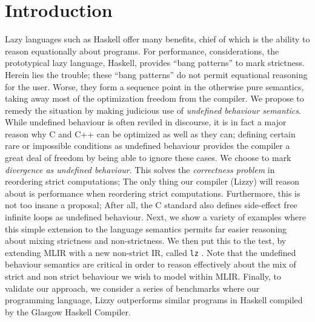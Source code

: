 \documentclass[sigplan,\review anonymous]{acmart}
\newcommand{\lz}{\texttt{lz} }
\begin{document}

\else
{} %
\renewcommand\footnotetextcopyrightpermission[1]{} %
\fi

\maketitle
\ifx\grammarly\grammarlyon 
\onecolumn 
\else 
\fi

\section{Introduction}

Lazy languages such as Haskell
offer many benefits, chief of which is the ability to reason
equationally about programs. For performance, considerations,
the prototypical lazy language, Haskell, provides ``bang patterns'' to
mark strictness. Herein lies the trouble; these ``bang patterns'' do not
permit equational reasoning for the user. Worse, they form a sequence point
in the otherwise pure semantics, taking away most of the optimization freedom
from the compiler. We propose to remedy the situation by making judicious use
of \emph{undefined behaviour semantics}. While undefined behaviour is often
reviled in discourse, it is in fact a major reason why C and C++ can be optimized
as well as they can; defining certain rare or impossible conditions as undefined
behaviour provides the compiler a great deal of freedom by being able to ignore
these cases. We choose to mark \emph{divergence as undefined behaviour}. This
solves the \emph{correctness problem} in reordering strict computations; The
only thing our compiler (Lizzy) will reason about is performance when reordering
strict computations. Furthermore, this is not too insane a proposal; After all,
the C standard also defines side-effect free infinite loops as undefined behaviour.
Next, we show a variety of examples where this simple extension to the language
semantics permits far easier reasoning about mixing strictness and non-strictness.
We then put this to the test, by extending MLIR with a new non-strict IR, called
\lz. Note that the undefined behaviour semantics are critical in order to
reason effectively about the mix of strict and non strict behaviour we wish
to model within MLIR. Finally, to validate our approach, we consider a series
of benchmarks where our programming language, Lizzy outperforms similar programs
in Haskell compiled by the Glasgow Haskell Compiler.
\end{document}
